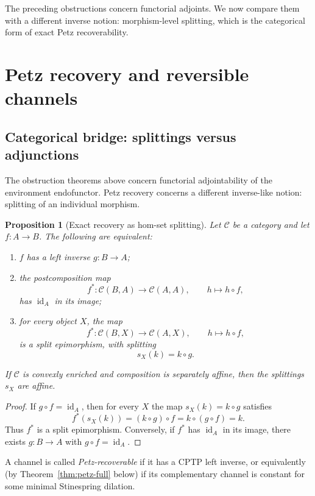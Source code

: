 \documentclass[11pt]{article}
\newtheorem{proposition}[theorem]{Proposition}
\DeclareMathOperator{\id}{id}
\begin{document}
The preceding obstructions concern functorial adjoints. We now compare them
with a different inverse notion: morphism-level splitting, which is the
categorical form of exact Petz recoverability.
\section{Petz recovery and reversible channels}
\label{sec:petz}

\subsection{Categorical bridge: splittings versus adjunctions}
\label{subsec:petz-bridge}

The obstruction theorems above concern functorial adjointability of the
environment endofunctor. Petz recovery concerns a different inverse-like
notion: splitting of an individual morphism.

\begin{proposition}[Exact recovery as hom-set splitting]
\label{prop:recovery-splitting}
Let $\mathcal C$ be a category and let $f:A\to B$. The following are
equivalent:
\begin{enumerate}
\item $f$ has a left inverse $g:B\to A$;
\item the postcomposition map
\[
f^*:\mathcal C(B,A)\longrightarrow \mathcal C(A,A),
\qquad
h\longmapsto h\circ f,
\]
has $\id_A$ in its image;
\item for every object $X$, the map
\[
f^*:\mathcal C(B,X)\longrightarrow \mathcal C(A,X),
\qquad
h\longmapsto h\circ f,
\]
is a split epimorphism, with splitting
\[
s_X(k)=k\circ g.
\]
\end{enumerate}
If $\mathcal C$ is convexly enriched and composition is separately affine,
then the splittings $s_X$ are affine.
\end{proposition}

\begin{proof}
If $g\circ f=\id_A$, then for every $X$ the map $s_X(k)=k\circ g$
satisfies
\[
f^*(s_X(k))=(k\circ g)\circ f=k\circ(g\circ f)=k.
\]
Thus $f^*$ is a split epimorphism. Conversely, if $f^*$ has $\id_A$ in its
image, there exists $g:B\to A$ with $g\circ f=\id_A$.
\end{proof}

A channel is called \emph{Petz-recoverable} if it has a CPTP left inverse,
or equivalently (by Theorem~\ref{thm:petz-full} below) if its complementary
channel is constant for some minimal Stinespring dilation.
\end{document}
